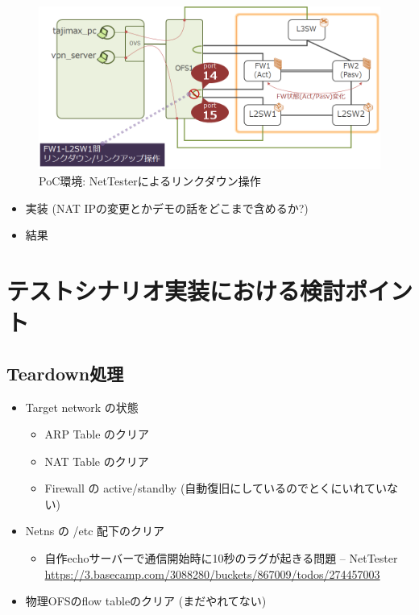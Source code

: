 \begin{figure}[h]
 \centering
 \includegraphics[scale=0.6]{img/poc-env-linkdown.png}
 \caption{PoC環境: NetTesterによるリンクダウン操作}
 \label{fig:poc-env-linkdown}
\end{figure}

\begin{itemize}
 \item 実装 (NAT IPの変更とかデモの話をどこまで含めるか?)
 \item 結果
\end{itemize}

\section{テストシナリオ実装における検討ポイント}

\subsection{Teardown処理}

\begin{itemize}
 \item Target network の状態
       \begin{itemize}
        \item ARP Table のクリア
        \item NAT Table のクリア
        \item Firewall の active/standby (自動復旧にしているのでとくにいれていない)
       \end{itemize}
 \item Netns の /etc 配下のクリア
       \begin{itemize}
        \item 自作echoサーバーで通信開始時に10秒のラグが起きる問題 – NetTester \url{https://3.basecamp.com/3088280/buckets/867009/todos/274457003}
       \end{itemize}
 \item 物理OFSのflow tableのクリア (まだやれてない)
\end{itemize}

